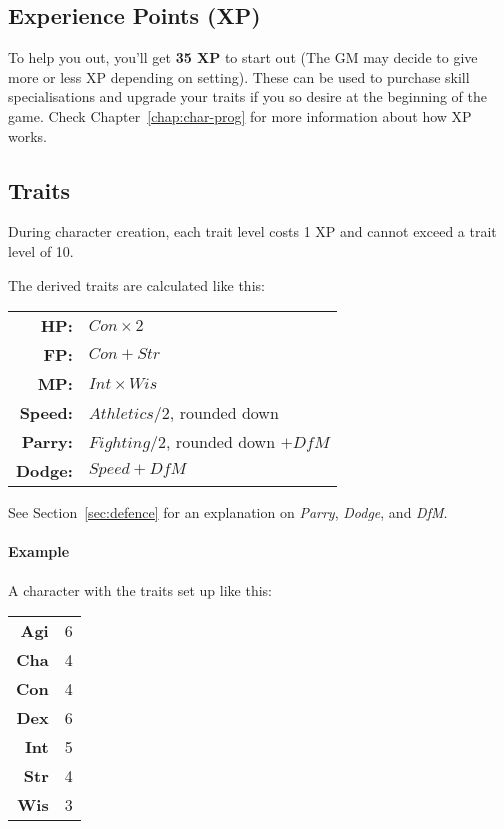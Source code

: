 \subsection{Experience Points (XP)}
To help you out, you'll get \textbf{35 XP} to start out (The GM may decide to give more or less XP depending on setting).
These can be used to purchase skill specialisations and upgrade your traits if you so desire at the beginning of the game.
Check Chapter~\ref{chap:char-prog} for more information about how XP works.

\subsection{Traits}
During character creation, each trait level costs 1 XP and cannot exceed a trait level of 10.

The derived traits are calculated like this:

\begin{tabular} {r | l} 
\textbf{HP:} & $Con \times 2$ \\
\textbf{FP:} & $Con + Str$ \\
\textbf{MP:} & $Int \times Wis$ \\
\textbf{Speed:} & $Athletics / 2$, rounded down\\
\textbf{Parry:} & $Fighting / 2$, rounded down $+ \mathit{DfM}$\\
\textbf{Dodge:} & $Speed + \mathit{DfM}$ \\
\end{tabular}

See Section~\ref{sec:defence} for an explanation on \textit{Parry}, \textit{Dodge}, and \textit{DfM}.

\paragraph{Example} A character with the traits set up like this:

\begin{tabular}{r | l}
    \textbf{Agi} & 6\\
    \textbf{Cha} & 4\\
    \textbf{Con} & 4\\
    \textbf{Dex} & 6\\
    \textbf{Int} & 5\\
    \textbf{Str} & 4\\
    \textbf{Wis} & 3\\
\end{tabular}

